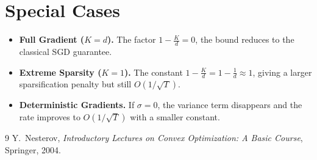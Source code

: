 \documentclass{article}
\begin{document}
\section*{Special Cases}
\begin{itemize}
\item \textbf{Full Gradient ($K=d$).} The factor $1-\frac{K}{d}=0$, the bound reduces to the classical SGD guarantee.
\item \textbf{Extreme Sparsity ($K=1$).} The constant $1-\frac{K}{d}=1-\frac{1}{d}\approx1$, giving a larger sparsification penalty but still $O(1/\sqrt{T})$.
\item \textbf{Deterministic Gradients.} If $\sigma=0$, the variance term disappears and the rate improves to $O(1/\sqrt{T})$ with a smaller constant.
\end{itemize}

\begin{thebibliography}{9}
Y.~Nesterov, \emph{Introductory Lectures on Convex Optimization: A Basic Course}, Springer, 2004.
\end{thebibliography}
\end{document}
